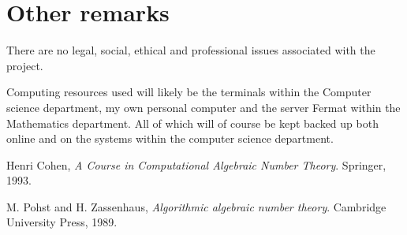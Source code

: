 \documentclass[11pt,a4paper]{article}
\begin{document}
\section*{Other remarks}
There are no legal, social, ethical and professional issues associated with the
project.

Computing resources used will likely be the terminals within the 
Computer science department, my own personal computer and the server Fermat
within the Mathematics department.
All of which will of course be kept backed up both online and on the systems
within the computer science department.


\begin{thebibliography}{Poh-Zas89}
  Henri Cohen, 
  \emph{A Course in Computational Algebraic Number Theory}.
  Springer,
  1993.

  M. Pohst and H. Zassenhaus, 
  \emph{Algorithmic algebraic number theory}.
  Cambridge University Press,
  1989.

\end{thebibliography}
\end{document}
